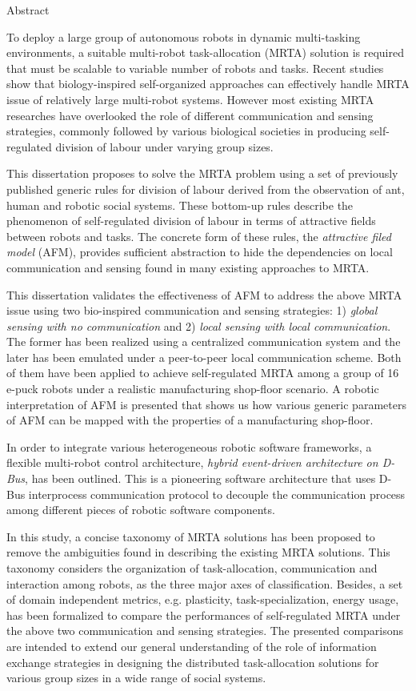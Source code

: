 \begin{Large}
\noindent
Abstract\\
\end{Large}
\newline
To deploy a large group of autonomous robots in dynamic multi-tasking environments,  a suitable multi-robot task-allocation (MRTA) solution is required that must be scalable to variable number of robots and tasks. Recent studies show that  biology-inspired self-organized approaches can effectively handle MRTA issue  of  relatively large multi-robot systems.  However most existing MRTA researches have overlooked the role of different communication and sensing strategies, commonly followed by various biological societies in producing self-regulated division of labour under varying group sizes.

This dissertation proposes to solve the MRTA problem using a set of  previously published generic rules for division of labour derived from the observation of ant, human and robotic social systems. These bottom-up rules describe the phenomenon of self-regulated division of labour in terms of attractive fields between robots and tasks. The concrete form of these rules, the \textit{attractive filed model} (AFM), provides sufficient abstraction to hide the dependencies  on local communication and sensing found in many existing approaches to MRTA. 

This dissertation validates the effectiveness of AFM to address the above MRTA issue using two bio-inspired communication and sensing strategies: 1) \textit{global sensing with no communication} and 2) \textit{local sensing with local communication}.  The former has been realized using a centralized communication system and the later has been emulated under a peer-to-peer local communication scheme. Both of them have been applied to achieve self-regulated MRTA among a group of 16 e-puck robots under a realistic manufacturing shop-floor scenario. A robotic interpretation of AFM is presented  that shows us how various generic parameters of AFM can be mapped with the properties of a  manufacturing shop-floor. 

In order to integrate various heterogeneous robotic software frameworks, a flexible multi-robot control architecture, \textit{hybrid event-driven architecture on D-Bus}, has been outlined. This is a pioneering software architecture that uses D-Bus interprocess communication protocol to decouple the communication  process among different pieces of robotic software components. 

In this study, a concise taxonomy of MRTA solutions has been proposed to remove the ambiguities found in describing the existing MRTA solutions. This taxonomy  considers the organization of task-allocation, communication and interaction among robots, as the three major axes of classification.  Besides, a set of domain independent metrics, e.g. plasticity, task-specialization, energy usage, has been formalized to compare  the performances  of self-regulated MRTA under the above two communication and sensing strategies. The presented comparisons are intended to extend our general understanding of the role of information exchange strategies in designing the distributed task-allocation solutions for various group sizes in a wide range of social systems.